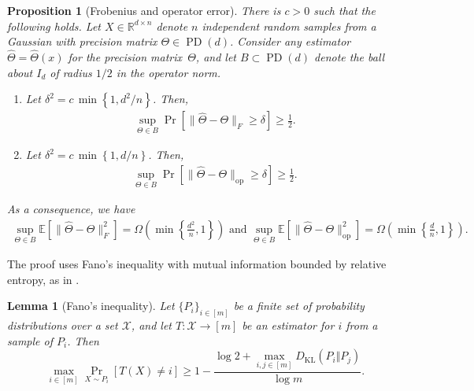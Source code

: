 \documentclass[aos]{imsart}
\newtheorem{prop}[theorem]{Proposition}
\newtheorem{lemma}[theorem]{Lemma}
\theoremstyle{definition}
\numberwithin{equation}{section}
\DeclareMathOperator{\op}{op}
\DeclareMathOperator{\PD}{PD}
\newcommand{\R}{{\mathbb{R}}}
\newcommand{\htheta}{\widehat{\Theta}}
\newcommand{\E}{\mathbb{E}}
\newcommand{\DKL}{D_{\operatorname{KL}}}
\begin{document}
\begin{prop}[Frobenius and operator error]\label{prp:standard-lower}
There is $c > 0$ such that the following holds.
Let $X \in \R^{d \times n}$ denote $n$ independent random samples from a Gaussian with precision matrix $\Theta \in \PD(d)$.
Consider any estimator $\htheta = \htheta(x)$ for the precision matrix~$\Theta$, and let $B\subset \PD(d)$ denote the ball about $I_d$ of radius $1/2$ in the operator norm.
\begin{enumerate}
\item Let $\delta^2 = c \, \min \left\{1,d^2/n\right\}$. Then,
\begin{align}
\sup_{\Theta \in B} \Pr\left[ \| \htheta - \Theta\|_F \geq \delta\right] \geq \frac{1}{2}.\label{eq:frob-lower}
\end{align}
\item Let $\delta^2 = c \, \min \left\{1,d/n\right\}$. Then,
 \begin{align}
\sup_{\Theta \in B} \Pr\left[ \| \htheta - \Theta\|_{\op} \geq \delta\right] \geq \frac{1}{2}. \label{eq:op-lower}
\end{align}
\end{enumerate}
As a consequence, we have
\begin{align*}
  \sup_{\Theta \in B}\E[\| \htheta - \Theta\|_F^2] =\Omega\left( \min \left\{\frac{d^2}{n},1\right\}\right)
\text{ and } \sup_{\Theta \in B}\E[\| \htheta - \Theta\|_{\op}^2] = \Omega\left( \min \left\{\frac{d}{n},1\right\}\right).
\end{align*}
\end{prop}
The proof uses Fano's inequality with mutual information bounded by relative entropy, as in \cite{yang1999information}.

\begin{lemma}[Fano's inequality]\label{lem:fano}
Let $\{P_i\}_{i \in [m]}$ be a finite set of probability distributions over a set $\mathcal X$, and let $T: \mathcal X \to [m]$ be an estimator for $i$ from a sample of $P_i$. Then
\[ \max_{i\in [m]} \Pr_{X \sim P_i}[T(X) \neq i] \geq 1 - \frac{ \log 2 + \max_{i,j \in [m]} \DKL(P_i\Vert  P_j)}{\log m}. \]
\end{lemma}
\end{document}

